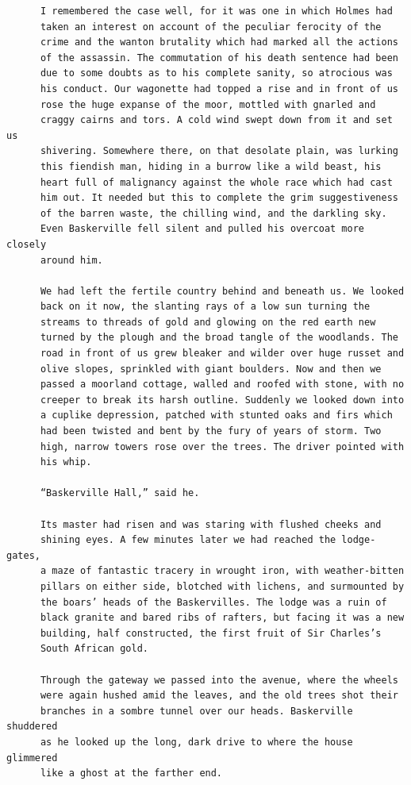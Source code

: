 \documentclass{article}
\begin{document}
\begin{verbatim}
      I remembered the case well, for it was one in which Holmes had
      taken an interest on account of the peculiar ferocity of the
      crime and the wanton brutality which had marked all the actions
      of the assassin. The commutation of his death sentence had been
      due to some doubts as to his complete sanity, so atrocious was
      his conduct. Our wagonette had topped a rise and in front of us
      rose the huge expanse of the moor, mottled with gnarled and
      craggy cairns and tors. A cold wind swept down from it and set us
      shivering. Somewhere there, on that desolate plain, was lurking
      this fiendish man, hiding in a burrow like a wild beast, his
      heart full of malignancy against the whole race which had cast
      him out. It needed but this to complete the grim suggestiveness
      of the barren waste, the chilling wind, and the darkling sky.
      Even Baskerville fell silent and pulled his overcoat more closely
      around him.

      We had left the fertile country behind and beneath us. We looked
      back on it now, the slanting rays of a low sun turning the
      streams to threads of gold and glowing on the red earth new
      turned by the plough and the broad tangle of the woodlands. The
      road in front of us grew bleaker and wilder over huge russet and
      olive slopes, sprinkled with giant boulders. Now and then we
      passed a moorland cottage, walled and roofed with stone, with no
      creeper to break its harsh outline. Suddenly we looked down into
      a cuplike depression, patched with stunted oaks and firs which
      had been twisted and bent by the fury of years of storm. Two
      high, narrow towers rose over the trees. The driver pointed with
      his whip.

      “Baskerville Hall,” said he.

      Its master had risen and was staring with flushed cheeks and
      shining eyes. A few minutes later we had reached the lodge-gates,
      a maze of fantastic tracery in wrought iron, with weather-bitten
      pillars on either side, blotched with lichens, and surmounted by
      the boars’ heads of the Baskervilles. The lodge was a ruin of
      black granite and bared ribs of rafters, but facing it was a new
      building, half constructed, the first fruit of Sir Charles’s
      South African gold.

      Through the gateway we passed into the avenue, where the wheels
      were again hushed amid the leaves, and the old trees shot their
      branches in a sombre tunnel over our heads. Baskerville shuddered
      as he looked up the long, dark drive to where the house glimmered
      like a ghost at the farther end.


\end{verbatim}
\end{document}
